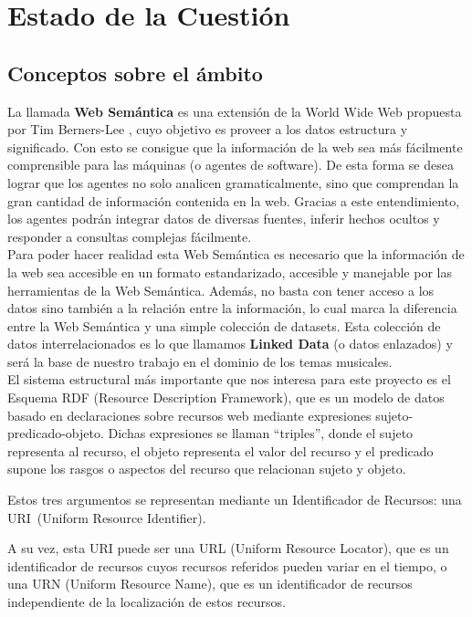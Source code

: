 \chapter{Estado de la Cuestión}
\label{cap:estadoDeLaCuestion}


\section{Conceptos sobre el ámbito}

La llamada \textbf{Web Semántica} es una extensión de la World Wide Web propuesta por Tim Berners-Lee \cite{berners2001}, cuyo objetivo es proveer a los datos estructura y significado. Con esto se consigue que la información de la web sea más fácilmente comprensible para las máquinas (o agentes de software). De esta forma se desea lograr que los agentes no solo analicen gramaticalmente, sino que comprendan la gran cantidad de información contenida en la web. Gracias a este entendimiento, los agentes podrán integrar datos de diversas fuentes, inferir hechos ocultos y responder a consultas complejas fácilmente.\cite{sakr2018}\\

Para poder hacer realidad esta Web Semántica es necesario que la información de la web sea accesible en un formato estandarizado, accesible y manejable por las herramientas de la Web Semántica. Además, no basta con tener acceso a los datos sino también a la relación entre la información, lo cual marca la diferencia entre la Web Semántica y una simple colección de datasets. Esta colección de datos interrelacionados es lo que llamamos \textbf{Linked Data} (o datos enlazados) y será la base de nuestro trabajo en el dominio de los temas musicales.\\

El sistema estructural más importante que nos interesa para este proyecto es el Esquema RDF (Resource Description Framework), que es un modelo de datos basado en declaraciones sobre recursos web mediante expresiones sujeto-predicado-objeto. Dichas expresiones se llaman “triples”, donde el sujeto representa al recurso, el objeto representa el valor del recurso y el predicado supone los rasgos o aspectos del recurso que relacionan sujeto y objeto.\cite{sakr2018}

Estos tres argumentos se representan mediante un Identificador de Recursos: una URI~(Uniform Resource Identifier).\cite{sakr2018,berners1998}

A su vez, esta URI puede ser una URL (Uniform Resource Locator), que es un identificador de recursos cuyos recursos referidos pueden variar en el tiempo, o una URN (Uniform Resource Name), que es un identificador de recursos independiente de la localización de estos recursos.\cite{berners1994,saint2017,sakr2018}

